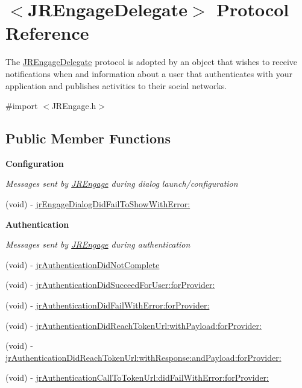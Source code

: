 \hypertarget{protocol_j_r_engage_delegate-p}{
\section{$<$JREngageDelegate$>$ Protocol Reference}
\label{protocol_j_r_engage_delegate-p}
}


The \hyperlink{protocol_j_r_engage_delegate-p}{JREngageDelegate} protocol is adopted by an object that wishes to receive notifications when and information about a user that authenticates with your application and publishes activities to their social networks.  




{\ttfamily \#import $<$JREngage.h$>$}

\subsection*{Public Member Functions}
\begin{Indent}{\bf Configuration}\par
{\em \label{_amgrp254f642527b45bc260048e30704edb39}
 Messages sent by \hyperlink{interface_j_r_engage}{JREngage} during dialog launch/configuration }\begin{DoxyCompactItemize}
\item 
(void) -\/ \hyperlink{protocol_j_r_engage_delegate-p_af46f7ef0c7a5767dc0ab705871d570ac}{jrEngageDialogDidFailToShowWithError:}
\end{DoxyCompactItemize}
\end{Indent}
\begin{Indent}{\bf Authentication}\par
{\em \label{_amgrpc75f7811d70d17dbcd88e9d03752cbed}
 Messages sent by \hyperlink{interface_j_r_engage}{JREngage} during authentication }\begin{DoxyCompactItemize}
\item 
(void) -\/ \hyperlink{protocol_j_r_engage_delegate-p_a4eaa6a5961e175b8275c6b06034afea7}{jrAuthenticationDidNotComplete}
\item 
(void) -\/ \hyperlink{protocol_j_r_engage_delegate-p_a6ac183348ebc0e858e8aad0682b5e1cd}{jrAuthenticationDidSucceedForUser:forProvider:}
\item 
(void) -\/ \hyperlink{protocol_j_r_engage_delegate-p_ac16b7db45fd324d597260dc8579b3a22}{jrAuthenticationDidFailWithError:forProvider:}
\item 
(void) -\/ \hyperlink{protocol_j_r_engage_delegate-p_abfafec7eed95008f7b7052d962f8f6fa}{jrAuthenticationDidReachTokenUrl:withPayload:forProvider:}
\item 
(void) -\/ \hyperlink{protocol_j_r_engage_delegate-p_a2cbed662f784706d2db038e1cb9ba3fd}{jrAuthenticationDidReachTokenUrl:withResponse:andPayload:forProvider:}
\item 
(void) -\/ \hyperlink{protocol_j_r_engage_delegate-p_a670eab0f76e79ba90a246a2f3e4dfe04}{jrAuthenticationCallToTokenUrl:didFailWithError:forProvider:}
\end{DoxyCompactItemize}
\end{Indent}
